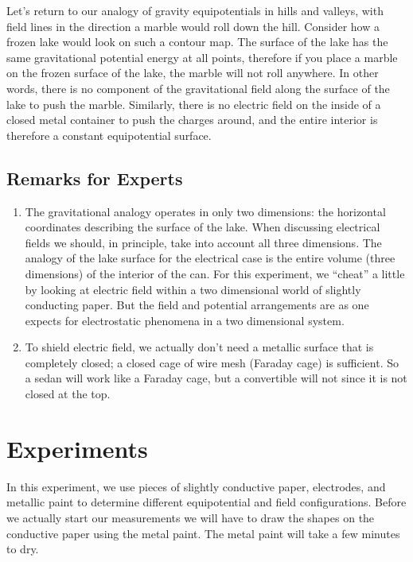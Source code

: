 Let’s return to our analogy of gravity equipotentials in hills and valleys, with field lines in the direction a marble would roll down the hill. Consider how a frozen lake would look on such a contour map. The surface of the lake has the same gravitational potential energy at all points, therefore if you place a marble on the frozen surface of the lake, the marble will not roll anywhere. In other words, there is no component of the gravitational field along the surface of the lake to push the marble. Similarly, there is no electric field on the inside of a closed metal container to push the charges around, and the entire interior is therefore a constant equipotential surface.

\subsection{Remarks for Experts}

\begin{enumerate}
    \item  The gravitational analogy operates in only two dimensions: the horizontal coordinates describing the surface of the lake. When discussing electrical fields we should, in principle, take into account all three dimensions. The analogy of the lake surface for the electrical case is the entire volume (three dimensions) of the interior of the can. For this experiment, we ``cheat'' a little by looking at electric field within a two dimensional world of slightly conducting paper. But the field and potential arrangements are as one expects for electrostatic phenomena in a two dimensional system.
    \item To shield electric field, we actually don't need a metallic surface that is completely closed; a closed cage of wire mesh (Faraday cage) is sufficient. So a sedan will work like a Faraday cage, but a convertible will not since it is not closed at the top.
\end{enumerate}

\section{Experiments}

In this experiment, we use pieces of slightly conductive paper, electrodes, and metallic paint to determine different equipotential and field configurations. Before we actually start our measurements we will have to draw the shapes on the conductive paper using the metal paint. The metal paint will take a few minutes to dry.


